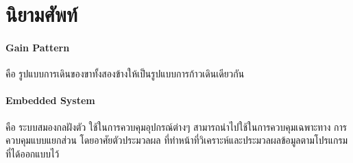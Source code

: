 \clearpage
\section{นิยามศัพท์}
\paragraph*{Gain Pattern}
คือ รูปแบบการเดินของขาทั้งสองข้างให้เป็นรูปแบบการก้าวเดินเดียวกัน

\paragraph*{Embedded System}
คือ ระบบสมองกลฝังตัว ใช้ในการควบคุมอุปกรณ์ต่างๆ สามารถนำไปใช้ในการควบคุมเฉพาะทาง
การควบคุมแบบแยกส่วน โดยอาศัยตัวประมวลผล ที่ทำหน้าที่วิเคราะห์และประมวลผลข้อมูลตามโปรแกรมที่ได้ออกแบบไว้

